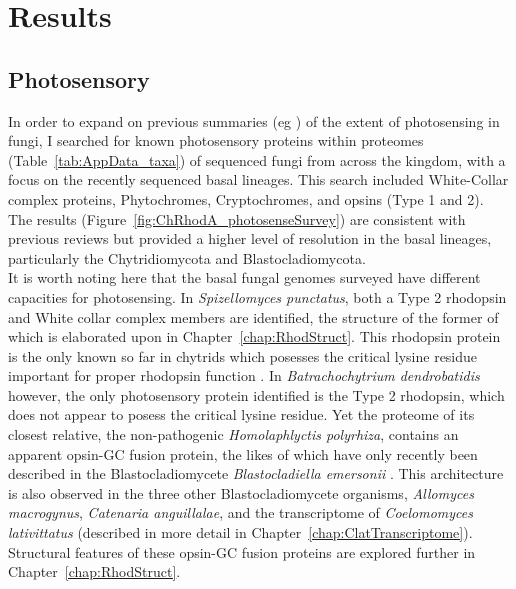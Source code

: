 \section{Results}

\subsection*{Photosensory}
In order to expand on previous summaries (eg \cite{Idnurm2010}) of the extent of photosensing in fungi, I searched for known photosensory proteins within proteomes (Table~\ref{tab:AppData_taxa}) of sequenced fungi from across the kingdom, with a focus on the recently sequenced basal lineages. This search included White-Collar complex proteins, Phytochromes, Cryptochromes, and opsins (Type 1 and 2). The results (Figure~\ref{fig:ChRhodA_photosenseSurvey}) are consistent with previous reviews but provided a higher level of resolution in the basal lineages, particularly the Chytridiomycota and Blastocladiomycota.\\
\indent It is worth noting here that the basal fungal genomes surveyed have different capacities for photosensing. In \textit{Spizellomyces punctatus}, both a Type 2 rhodopsin and White collar complex members are identified, the structure of the former of which is elaborated upon in Chapter~\ref{chap:RhodStruct}. This rhodopsin protein is the only known so far in chytrids which posesses the critical lysine residue important for proper rhodopsin function \cite{Smith2010}. In \textit{Batrachochytrium dendrobatidis} however, the only photosensory protein identified is the Type 2 rhodopsin, which does not appear to posess the critical lysine residue. Yet the proteome of its closest relative, the non-pathogenic \textit{Homolaphlyctis polyrhiza}, contains an apparent opsin-GC fusion protein, the likes of which have only recently been described in the Blastocladiomycete \textit{Blastocladiella emersonii} \cite{Avelar2014}. This architecture is also observed in the three other Blastocladiomycete organisms, \textit{Allomyces macrogynus}, \textit{Catenaria anguillalae}, and the transcriptome of \textit{Coelomomyces lativittatus} (described in more detail in Chapter~\ref{chap:ClatTranscriptome}). Structural features of these opsin-GC fusion proteins are explored further in Chapter~\ref{chap:RhodStruct}.\\

